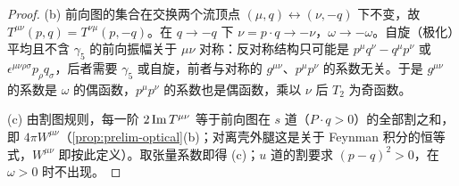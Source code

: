 \begin{proof}
(b) 前向图的集合在交换两个流顶点 $(\mu,q)\leftrightarrow(\nu,-q)$ 下不变，故 $T^{\mu\nu}(p,q)=T^{\nu\mu}(p,-q)$。在 $q\to-q$ 下 $\nu=p\cdot q\to-\nu$，$\omega\to-\omega$。自旋（极化）平均且不含 $\gamma_5$ 的前向振幅关于 $\mu\nu$ 对称：反对称结构只可能是 $p^\mu q^\nu-q^\mu p^\nu$ 或 $\epsilon^{\mu\nu\rho\sigma}p_\rho q_\sigma$，后者需要 $\gamma_5$ 或自旋，前者与对称的 $g^{\mu\nu}$、$p^\mu p^\nu$ 的系数无关。于是 $g^{\mu\nu}$ 的系数是 $\omega$ 的偶函数，$p^\mu p^\nu$ 的系数也是偶函数，乘以 $\nu$ 后 $T_2$ 为奇函数。

(c) 由割图规则，每一阶 $2\operatorname{Im} T^{\mu\nu}$ 等于前向图在 $s$ 道（$P\cdot q>0$）的全部割之和，即 $4\pi W^{\mu\nu}$（\cref{prop:prelim-optical}(b)；对离壳外腿这是关于 Feynman 积分的恒等式，$W^{\mu\nu}$ 即按此定义）。取张量系数即得 (c)；$u$ 道的割要求 $(p-q)^2>0$，在 $\omega>0$ 时不出现。


\end{proof}
